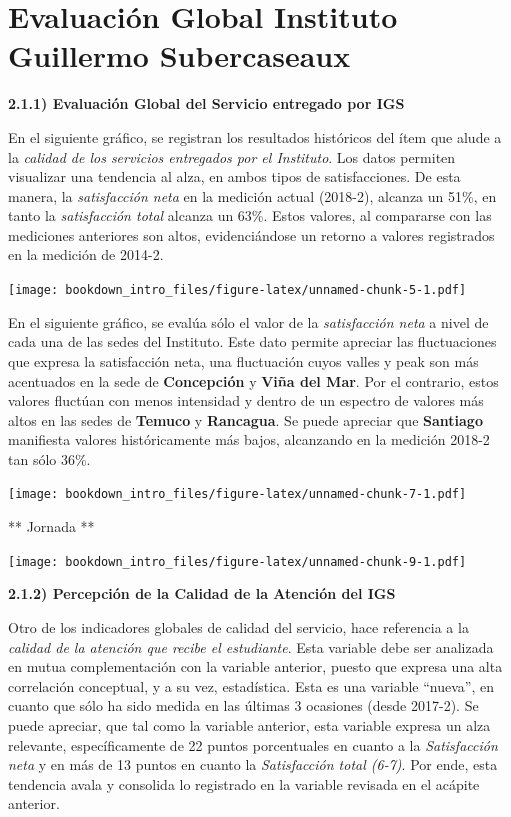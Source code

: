\documentclass[]{book}
\begin{document}
\section{Evaluación Global Instituto Guillermo
Subercaseaux}\label{evaluacion-global-instituto-guillermo-subercaseaux}

\textbf{2.1.1) Evaluación Global del Servicio entregado por IGS}

En el siguiente gráfico, se registran los resultados históricos del ítem
que alude a la \emph{calidad de los servicios entregados por el
Instituto}. Los datos permiten visualizar una tendencia al alza, en
ambos tipos de satisfacciones. De esta manera, la \emph{satisfacción
neta} en la medición actual (2018-2), alcanza un 51\%, en tanto la
\emph{satisfacción total} alcanza un 63\%. Estos valores, al compararse
con las mediciones anteriores son altos, evidenciándose un retorno a
valores registrados en la medición de 2014-2.

\texttt{[image: bookdown\_intro\_files/figure-latex/unnamed-chunk-5-1.pdf]}

En el siguiente gráfico, se evalúa sólo el valor de la
\emph{satisfacción neta} a nivel de cada una de las sedes del Instituto.
Este dato permite apreciar las fluctuaciones que expresa la satisfacción
neta, una fluctuación cuyos valles y peak son más acentuados en la sede
de \textbf{Concepción} y \textbf{Viña del Mar}. Por el contrario, estos
valores fluctúan con menos intensidad y dentro de un espectro de valores
más altos en las sedes de \textbf{Temuco} y \textbf{Rancagua}. Se puede
apreciar que \textbf{Santiago} manifiesta valores históricamente más
bajos, alcanzando en la medición 2018-2 tan sólo 36\%.

\texttt{[image: bookdown\_intro\_files/figure-latex/unnamed-chunk-7-1.pdf]}

** Jornada **

\texttt{[image: bookdown\_intro\_files/figure-latex/unnamed-chunk-9-1.pdf]}

\textbf{2.1.2) Percepción de la Calidad de la Atención del IGS}

Otro de los indicadores globales de calidad del servicio, hace
referencia a la \emph{calidad de la atención que recibe el estudiante}.
Esta variable debe ser analizada en mutua complementación con la
variable anterior, puesto que expresa una alta correlación conceptual, y
a su vez, estadística. Esta es una variable ``nueva'', en cuanto que
sólo ha sido medida en las últimas 3 ocasiones (desde 2017-2). Se puede
apreciar, que tal como la variable anterior, esta variable expresa un
alza relevante, específicamente de 22 puntos porcentuales en cuanto a la
\emph{Satisfacción neta} y en más de 13 puntos en cuanto la
\emph{Satisfacción total (6-7)}. Por ende, esta tendencia avala y
consolida lo registrado en la variable revisada en el acápite anterior.
\end{document}
